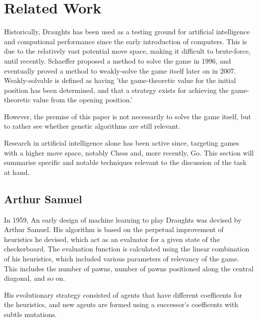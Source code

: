 \documentclass[12pt,a4paper]{article}
\begin{document}
\section{Related Work}
        Historically, Draughts has been used as a testing ground for artificial intelligence and computional performance since the early introduction of computers. This is due to the relatively vast potential move space, making it difficult to brute-force, until recently. Schaeffer proposed a method to solve the game in 1996\cite{schaeffer_solving_1996}, and eventually proved a method to weakly-solve the game itself later on in 2007\cite{schaeffer_checkers_2007}. Weakly-solvable is defined as having 'the game-theoretic value for the initial position has been determined, and that a strategy exists for achieving the game-theoretic value from the opening position.' \cite{allis_searching_1994}
        
        However, the premise of this paper is not necessarily to solve the game itself, but to rather see whether genetic algorithms are still relevant.

        Research in artificial intelligence alone has been active since, targeting games with a higher move space, notably Chess and, more recently, Go. This section will summarise specific and notable techniques relevant to the discussion of the task at hand.

    \subsection{Arthur Samuel}
        In 1959, An early design of machine learning to play Draughts was devised by Arthur Samuel\cite{samuel_studies_1959}. His algorithm is based on the perpetual improvement of heuristics he devised, which act as an evaluator for a given state of the checkerboard. The evaluation function is calculated using the linear combination of his heuristics, which included various parameters of relevancy of the game. This includes the number of pawns, number of pawns positioned along the central diagonal, and so on. 

        His evolutionary strategy consisted of agents that have different coefficents for the heuristics, and new agents are formed using a successor's coefficents with subtle mutations.
\end{document}
